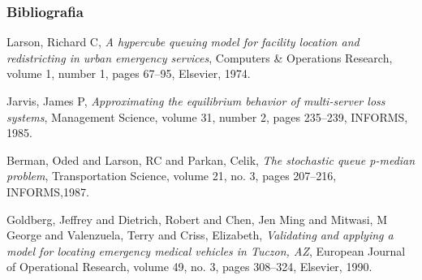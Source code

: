 
\begin{frame}[allowframebreaks]
  \frametitle<presentation>{Bibliografia}    
{\tiny
  \begin{thebibliography}{10}    
    \beamertemplatebookbibitems

    Larson, Richard C,
    \emph{A hypercube queuing model for facility location and redistricting in urban emergency services},
    Computers \& Operations Research, volume 1, number 1, pages 67--95, Elsevier, 1974.
      
    Jarvis, James P,
    \emph{Approximating the equilibrium behavior of multi-server loss systems},
    Management Science, volume 31, number 2, pages 235--239, INFORMS, 1985.

    Berman, Oded and Larson, RC and Parkan, Celik,
    \emph{The stochastic queue p-median problem},
    Transportation Science, volume 21, no. 3, pages 207--216, INFORMS,1987.

    Goldberg, Jeffrey and Dietrich, Robert and Chen, Jen Ming and Mitwasi, M George and Valenzuela, Terry and Criss, Elizabeth,
    \emph{Validating and applying a model for locating emergency medical vehicles in Tuczon, AZ},
    European Journal of Operational Research, volume 49, no. 3, pages 308--324, Elsevier, 1990.




  \end{thebibliography}
}
\end{frame}
